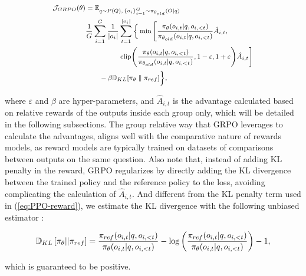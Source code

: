 \begin{itemize}[topsep=0pt]
\begin{itemize}[topsep=0pt]
\begin{equation}
\footnotesize
\begin{split}
    \mathcal{J}_{GRPO}(\theta) &= \mathbb{E}_{q \sim P(Q),\, \{o_i\}_{i=1}^G \sim \pi_{\theta_{old}}(O|q)}  \\
    & \frac{1}{G} \sum_{i=1}^G \frac{1}{|o_i|} \sum_{t=1}^{|o_i|} \bigg\{ \min \Bigg[ \frac{\pi_\theta(o_{i,t} | q, o_{i,<t})}{\pi_{\theta_{old}}(o_{i,t} | q, o_{i,<t})} \hat{A}_{i,t}, \\
    & \hspace{5em} \text{clip}\Bigg( \frac{\pi_\theta(o_{i,t} | q, o_{i,<t})}{\pi_{\theta_{old}}(o_{i,t} | q, o_{i,<t})}, 1 - \varepsilon, 1 + \varepsilon \Bigg) \hat{A}_{i,t} \Bigg] \\
    & \hspace{2em} - \beta \mathbb{D}_{KL}[\pi_{\theta} \parallel \pi_{ref}] \bigg\} ,
\end{split}
\label{eq:GRPO-obj}
\end{equation}

where $\varepsilon$ and $\beta$ are hyper-parameters, and $\hat{A}_{i,t}$  is the advantage calculated based on relative rewards of the outputs inside each group only, which will be detailed in the following subsections. The group relative way that GRPO leverages to calculate the advantages, aligns well with the comparative nature of rewards models,  as reward models are typically trained on datasets of comparisons between outputs on the same question. Also note that, instead of adding KL penalty in the reward, GRPO regularizes by directly adding the KL divergence between the trained policy and the reference policy to the loss, avoiding complicating the calculation of  $\hat{A}_{i,t}$. And different from the KL penalty term used in (\ref{eq:PPO-reward}), we estimate the KL divergence with the following unbiased estimator \citep{kl_approx}:

\begin{equation}
\small
    \mathbb{D}_{KL}\left[\pi_{\theta} || \pi_{ref}\right] = \frac{\pi_{ref}(o_{i,t}|q,o_{i,<t})}{\pi_{\theta}(o_{i,t}|q,o_{i,<t})} - \log\left(\frac{\pi_{ref}(o_{i,t}|q,o_{i,<t})}{\pi_{\theta}(o_{i,t}|q,o_{i,<t})}\right) - 1,
\end{equation}

which is guaranteed to be positive.


\end{itemize}
\end{itemize}
